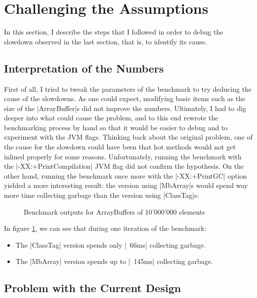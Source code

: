 
\section{Challenging the Assumptions}

In this section, I describe the steps that I followed in order to debug the slowdown observed in the last section, that is, to identify its cause.

\subsection{Interpretation of the Numbers}

First of all, I tried to tweak the parameters of the benchmark to try deducing the cause of the slowdowns. As one could expect, modifying basic items such as the size of the |ArrayBuffer|s did not improve the numbers. Ultimately, I had to dig deeper into what could cause the problem, and to this end rewrote the benchmarking process by hand so that it would be easier to debug and to experiment with the JVM flags. Thinking back about the original problem, one of the cause for the slowdown could have been that hot methods would not get inlined properly for some reasons. Unfortunately, running the benchmark with the |-XX:+PrintCompilation| JVM flag did not confirm the hypothesis. On the other hand, running the benchmark once more with the |-XX:+PrintGC| option yielded a more interesting result: the version using |MbArray|s would spend way more time collecting garbage than the version using |ClassTag|s:

\begin{figure}
\caption{Benchmark outputs for ArrayBuffers of 10'000'000 elements}
\label{fig:GcComp}
\end{figure}

In figure \ref{fig:GcComp}, we can see that during one iteration of the benchmark:
\begin{itemize}
  \item The |ClassTag| version spends only |~66ms| collecting garbage.
  \item The |MbArray| version spends up to |~145ms| collecting garbage. 
\end{itemize} 

\subsection{Problem with the Current Design}

